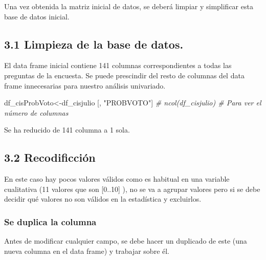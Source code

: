 \documentclass[
  12 pt,
  a4paper,
]{article}
\newenvironment{Shaded}{\begin{snugshade}}{\end{snugshade}}
\newcommand{\CommentTok}[1]{\textcolor[rgb]{0.56,0.35,0.01}{\textit{#1}}}
\newcommand{\NormalTok}[1]{#1}
\newcommand{\OtherTok}[1]{\textcolor[rgb]{0.56,0.35,0.01}{#1}}
\newcommand{\SpecialCharTok}[1]{\textcolor[rgb]{0.81,0.36,0.00}{\textbf{#1}}}
\newcommand{\StringTok}[1]{\textcolor[rgb]{0.31,0.60,0.02}{#1}}
\begin{document}
Una vez obtenida la matriz inicial de datos, se deberá limpiar y
simplificar esta base de datos inicial.

\hypertarget{limpieza-de-la-base-de-datos.}{%
\subsection{3.1 Limpieza de la base de
datos.}\label{limpieza-de-la-base-de-datos.}}

El data frame inicial contiene 141 columnas correspondientes a todas las
preguntas de la encuesta. Se puede prescindir del resto de columnas del
data frame innecesarias para nuestro análisis univariado.

\begin{Shaded}
\begin{Highlighting}[]
\NormalTok{df\_cisProbVoto}\OtherTok{\textless{}{-}}\NormalTok{df\_cisjulio [, }\StringTok{"PROBVOTO"}\NormalTok{]}
\CommentTok{\# ncol(df\_cisjulio) \# Para ver el número de columnas}
\end{Highlighting}
\end{Shaded}

Se ha reducido de 141 columna a 1 sola.

\hypertarget{recodificciuxf3n}{%
\subsection{3.2 Recodificción}\label{recodificciuxf3n}}

En este caso hay pocos valores válidos como es habitual en una variable
cualitativa (11 valores que son {[}0..10{]} ), no se va a agrupar
valores pero si se debe decidir qué valores no son válidos en la
estadística y excluirlos.

\hypertarget{se-duplica-la-columna}{%
\subsubsection{Se duplica la columna}\label{se-duplica-la-columna}}

Antes de modificar cualquier campo, se debe hacer un duplicado de este
(una nueva columna en el data frame) y trabajar sobre él.

\begin{Shaded}
\end{Shaded}
\end{document}
